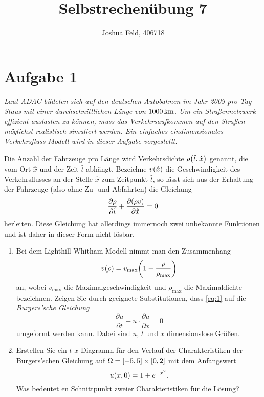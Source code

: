 \documentclass{exercise}
\institute{Applied and Computational Mathematics}
\title{Selbstrechenübung 7}
\author{Joshua Feld, 406718}
\begin{document}
    \maketitle


    \section*{Aufgabe 1}
    
    \begin{problem}
        \emph{Laut ADAC bildeten sich auf den deutschen Autobahnen im Jahr 2009 pro Tag Staus mit einer durchschnittlichen Länge von \(1000\sis{\kilo\meter}\).
        Um ein Straßennetzwerk effizient auslasten zu können, muss das Verkehrsaufkommen auf den Straßen möglichst realistisch simuliert werden.
        Ein einfaches eindimensionales Verkehrsfluss-Modell wird in dieser Aufgabe vorgestellt.}

        Die Anzahl der Fahrzeuge pro Länge wird Verkehrsdichte \(\rho\parentheses*{\hat{t}, \hat{x}}\) genannt, die vom Ort \(\hat{x}\) und der Zeit \(\hat{t}\) abhängt.
        Bezeichne \(v\parentheses*{\hat{x}}\) die Geschwindigkeit des Verkehrsflusses an der Stelle \(\hat{x}\) zum Zeitpunkt \(\hat{t}\), so lässt sich aus der Erhaltung der Fahrzeuge (also ohne Zu- und Abfahrten) die Gleichung
        \begin{equation}\label{eq:1}
            \frac{\partial\rho}{\partial\hat{t}} + \frac{\partial\parentheses*{\rho v}}{\partial\hat{x}} = 0
        \end{equation}
        herleiten.
        Diese Gleichung hat allerdings immernoch zwei unbekannte Funktionen und ist daher in dieser Form nicht lösbar.
        \begin{enumerate}
            \item Bei dem Lighthill-Whitham Modell nimmt man den Zusammenhang
            \[
                v\parentheses*{\rho} = v_{\text{max}}\parentheses*{1 - \frac{\rho}{\rho_{\text{max}}}}
            \]
            an, wobei \(v_{\text{max}}\) die Maximalgeschwindigkeit und \(\rho_{\text{max}}\) die Maximaldichte bezeichnen.
            Zeigen Sie durch geeignete Substitutionen, dass \eqref{eq:1} auf die \emph{Burgers'sche Gleichung}
            \[
                \frac{\partial u}{\partial t} + u \cdot \frac{\partial u}{\partial x} = 0
            \]
            umgeformt werden kann.
            Dabei sind \(u\), \(t\) und \(x\) dimensionslose Größen.
            \item Erstellen Sie ein \(t\)-\(x\)-Diagramm für den Verlauf der Charakteristiken der Burgers'schen Gleichung auf \(\Omega = \brackets*{-5, 5} \times \brackets*{0, 2}\) mit dem Anfangswert
            \[
                u\parentheses*{x, 0} = 1 + e^{-x^2}.
            \]
            Was bedeutet en Schnittpunkt zweier Charakteristiken für die Lösung?
        \end{enumerate}
    \end{problem}
\end{document}
